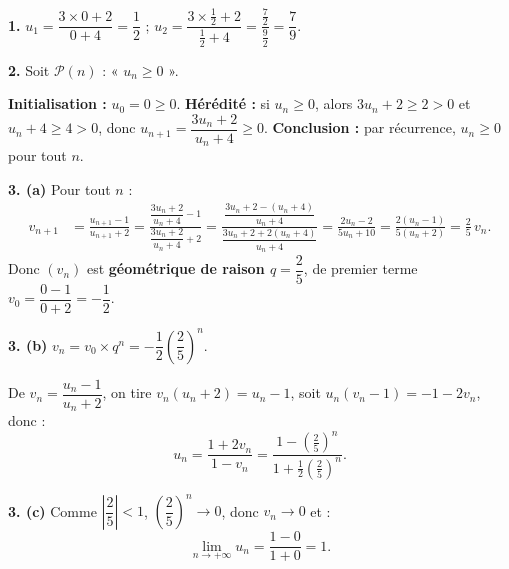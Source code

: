 \documentclass[11pt]{article}
\begin{document}
\begin{corrige}
\textbf{1.} $u_1 = \dfrac{3 \times 0 + 2}{0 + 4} = \dfrac{1}{2}$ ; \quad $u_2 = \dfrac{3 \times \frac{1}{2} + 2}{\frac{1}{2} + 4} = \dfrac{\frac{7}{2}}{\frac{9}{2}} = \dfrac{7}{9}$.

\textbf{2.} Soit $\mathcal{P}(n)$ : « $u_n \geq 0$ ».

\textbf{Initialisation :} $u_0 = 0 \geq 0$. \textbf{Hérédité :} si $u_n \geq 0$, alors $3u_n + 2 \geq 2 > 0$ et $u_n + 4 \geq 4 > 0$, donc $u_{n+1} = \dfrac{3u_n+2}{u_n+4} \geq 0$. \textbf{Conclusion :} par récurrence, $u_n \geq 0$ pour tout $n$.

\textbf{3. (a)} Pour tout $n$ :
\begin{align*}
v_{n+1} &= \frac{u_{n+1} - 1}{u_{n+1} + 2} = \frac{\dfrac{3u_n + 2}{u_n + 4} - 1}{\dfrac{3u_n + 2}{u_n + 4} + 2} = \frac{\dfrac{3u_n + 2 - (u_n + 4)}{u_n + 4}}{\dfrac{3u_n + 2 + 2(u_n + 4)}{u_n + 4}} = \frac{2u_n - 2}{5u_n + 10} = \frac{2(u_n - 1)}{5(u_n + 2)} = \frac{2}{5}\, v_n.
\end{align*}
Donc $(v_n)$ est \textbf{géométrique de raison $q = \dfrac{2}{5}$}, de premier terme $v_0 = \dfrac{0 - 1}{0 + 2} = -\dfrac{1}{2}$.

\textbf{3. (b)} $v_n = v_0 \times q^n = -\dfrac{1}{2}\left(\dfrac{2}{5}\right)^n$.

De $v_n = \dfrac{u_n - 1}{u_n + 2}$, on tire $v_n(u_n + 2) = u_n - 1$, soit $u_n(v_n - 1) = -1 - 2v_n$, donc :
\[ u_n = \frac{1 + 2v_n}{1 - v_n} = \frac{1 - \left(\frac{2}{5}\right)^n}{1 + \frac{1}{2}\left(\frac{2}{5}\right)^n}. \]

\textbf{3. (c)} Comme $\left|\dfrac{2}{5}\right| < 1$, $\left(\dfrac{2}{5}\right)^n \to 0$, donc $v_n \to 0$ et :
\[ \lim_{n \to +\infty} u_n = \frac{1 - 0}{1 + 0} = 1. \]
\end{corrige}
\end{document}
